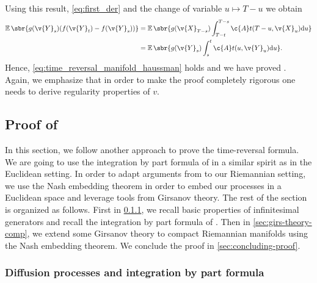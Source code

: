 Using this result, \eqref{eq:first_der} and the change of variable \(u \mapsto T-u\) we obtain \begin{align} \E\sbr{g(\v{Y}_s)(f(\v{Y}_t) - f(\v{Y}_s))} &= {\E\sbr{g(\v{X}_{T-s})\int_{T-t}^{T-s} \c{A}t(T-u, \v{X}_u) \mathrm{d} u } } \\ &= {\E\sbr{g(\v{Y}_{s})\int_{s}^{t} \c{A}t(u, \v{Y}_u) \mathrm{d} u } } .
\end{align}
Hence, \eqref{eq:time_reversal_manifold_haussman} holds and we have proved .
Again, we emphasize that in order to make the proof completely rigorous one needs to derive regularity properties of \(v\).

\subsection{Proof of }
\label{sec:proof-crefthm:t}

In this section, we follow another approach to prove the time-reversal formula.
We are going to use the integration by part formula of \textcite[Theorem 3.17]{cattiaux2021time} in a similar spirit as \textcite[Theorem 4.9]{cattiaux2021time} in the Euclidean setting.
In order to adapt arguments from \textcite{cattiaux2021time} to our Riemannian setting, we use the Nash embedding theorem in order to embed our processes in a Euclidean space and leverage tools from Girsanov theory.
The rest of the section is organized as follows.
First in \cref{sec:diff-proc-stoch}, we recall basic properties of infinitesimal generators and recall the integration by part formula of \textcite[Theorem 3.17]{cattiaux2021time}.
Then in \cref{sec:girs-theory-comp}, we extend some Girsanov theory to compact Riemannian manifolds using the Nash embedding theorem.
We conclude the proof in \cref{sec:concluding-proof}.

\subsubsection{Diffusion processes and integration by part formula}
\label{sec:diff-proc-stoch}


